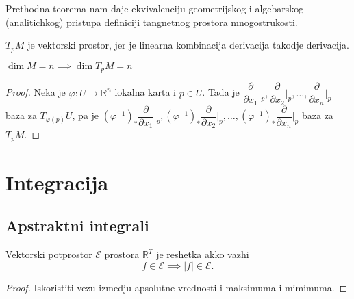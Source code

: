\documentclass[a4paper,12pt]{article}
\newcommand{\RR}{\mathbb{R}}
\begin{document}
\begin{nap}
	Prethodna teorema nam daje ekvivalenciju geometrijskog i algebarskog (analitichkog) pristupa
	definiciji tangnetnog prostora mnogostrukosti.
\end{nap}

\begin{posl}
	$T_p M$ je vektorski prostor, jer je linearna kombinacija derivacija takodje derivacija.
\end{posl}

\begin{posl}
	$\dim M = n \implies \dim T_p M = n$
\end{posl}
\begin{proof}
	Neka je $\varphi : U \to \RR^n$ lokalna karta i $p \in U$. Tada je 
	$\dfrac{\partial }{\partial x_1} \Big|_p, \dfrac{\partial }{\partial x_2}\Big|_p, \dotso, \dfrac{\partial }{\partial x_n}\Big|_p$
	baza za $T_{\varphi(p)} U$, pa je 
	$(\varphi^{-1})_*\dfrac{\partial }{\partial x_1}\Big|_p, (\varphi^{-1})_*\dfrac{\partial }{\partial x_2}\Big|_p, \dotso, (\varphi^{-1})_*\dfrac{\partial }{\partial x_n}\Big|_p$
	baza za $T_p M$.
\end{proof}

\section{Integracija}

\subsection{Apstraktni integrali}

\begin{lema}
	Vektorski potprostor $\mathcal{E}$ prostora $\RR^T$ je reshetka akko vazhi
	\[ f \in \mathcal{E} \implies |f| \in \mathcal{E} .\]
\end{lema}
\begin{proof}
	Iskoristiti vezu izmedju apsolutne vrednosti i maksimuma i mimimuma.
\end{proof}
\end{document}
